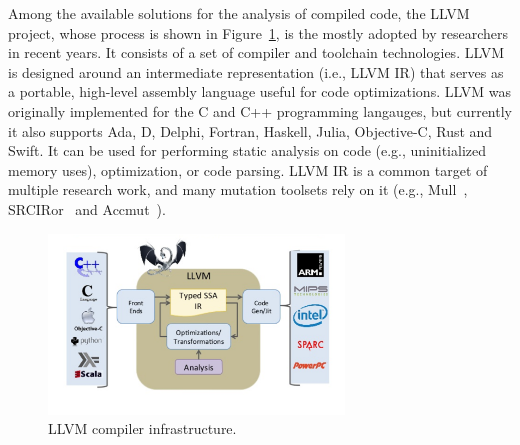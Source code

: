 
Among the available solutions for the analysis of compiled code, the LLVM project, whose process is shown in Figure~\ref{fig:compileTime:llvm}, is the mostly adopted by researchers in recent years. It consists of a set of compiler and toolchain technologies. LLVM is designed around an intermediate representation (i.e., LLVM IR) that serves as a portable, high-level assembly language useful for code optimizations. LLVM was originally implemented for the C and C++ programming langauges, but currently it also supports Ada, D, Delphi, Fortran, Haskell, Julia, Objective-C, Rust and Swift. It can be used for performing static analysis on code (e.g., uninitialized memory uses), optimization, or code parsing.
LLVM IR is a common target of multiple research work, and many mutation toolsets rely on it (e.g., Mull~\cite{denisov2018mull}, SRCIRor~\cite{hariri2018srciror,hariri2019comparing} and Accmut~\cite{wang2017faster}).

	\begin{figure}
	\centering
		\includegraphics[width=0.7\textwidth]{images/llvm}
		\caption{LLVM compiler infrastructure.}
		\label{fig:compileTime:llvm}
	\end{figure}





